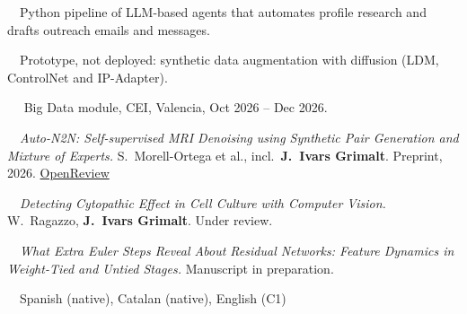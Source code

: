 \documentclass[11pt, a4paper]{../awesome-cv}
\begin{document}
\par\nopagebreak
\vspace{\acvSectionContentTopSkip}
\vspace{-2.5mm}
{\bodyfont\fontsize{7.6pt}{0.95em}\selectfont\raggedright
\noindent\textbullet~~Python pipeline of LLM-based agents that automates profile research and drafts outreach emails and messages.\par
\vspace{0.15mm}
\noindent\textbullet~~Prototype, not deployed: synthetic data augmentation with diffusion (LDM, ControlNet and IP-Adapter).\par
}


\vspace{0.4mm}
~~{\fontsize{8pt}{1em}\bodyfontlight\color{text} Big Data module, CEI, Valencia, Oct 2026 – Dec 2026.}\par

\par\nopagebreak
\vspace{\acvSectionContentTopSkip}
\vspace{-2.5mm}
{\bodyfont\fontsize{7.6pt}{0.95em}\selectfont\raggedright
\noindent\textbullet~~\textit{Auto-N2N: Self-supervised MRI Denoising using Synthetic Pair Generation and Mixture of Experts.}
S.\ Morell-Ortega et al., incl.\ \textbf{J.\ Ivars Grimalt}. Preprint, 2026. \href{https://openreview.net/forum?noteId=1f93N1n8RP}{OpenReview}\par
\vspace{0.15mm}
\noindent\textbullet~~\textit{Detecting Cytopathic Effect in Cell Culture with Computer Vision.}
W.\ Ragazzo, \textbf{J.\ Ivars Grimalt}. Under review.\par
\vspace{0.15mm}
\noindent\textbullet~~\textit{What Extra Euler Steps Reveal About Residual Networks: Feature Dynamics in Weight-Tied and Untied Stages.} Manuscript in preparation.\par
\vspace{0.6mm}
~~Spanish (native), Catalan (native), English (C1)\par
}

\end{document}
